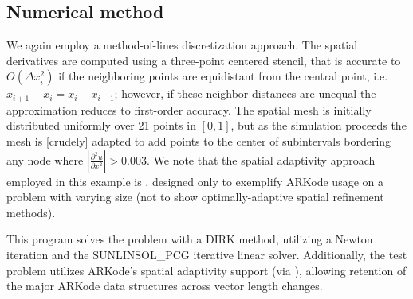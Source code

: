 \documentclass[letterpaper,10pt,english]{sphinxmanual}
\begin{document}
\subsection{Numerical method}
\label{\detokenize{c_serial:id29}}
We again employ a method-of-lines discretization approach.  The
spatial derivatives are computed using a three-point centered stencil,
that is accurate to \(O(\Delta x_i^2)\) if the neighboring points are
equidistant from the central point, i.e. \(x_{i+1} - x_i = x_i -
x_{i-1}\); however, if these neighbor distances are unequal the
approximation reduces to first-order accuracy.  The spatial mesh is
initially distributed uniformly over 21 points in \([0,1]\), but
as the simulation proceeds the mesh is {[}crudely{]} adapted to add points
to the center of subintervals bordering any node where
\(\left|\frac{\partial^2 u}{\partial x^2}\right| > 0.003\).
We note that the spatial adaptivity approach employed in this example
is , designed only to exemplify ARKode usage on a problem with
varying size (not to show optimally-adaptive spatial refinement
methods).

This program solves the problem with a DIRK method, utilizing a Newton
iteration and the SUNLINSOL\_PCG iterative linear solver.
Additionally, the test problem utilizes ARKode’s spatial adaptivity
support (via ), allowing retention of the
major ARKode data structures across vector length changes.
\end{document}
